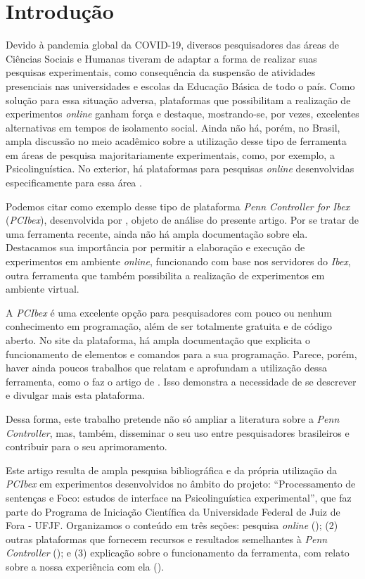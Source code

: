 \documentclass{textolivre}
\begin{document}
\section{Introdução}\label{sec-intro}
Devido à pandemia global da COVID-19, diversos pesquisadores das áreas de Ciências Sociais e Humanas tiveram de adaptar a forma de realizar suas pesquisas experimentais, como consequência da suspensão de atividades presenciais nas universidades e escolas da Educação Básica de todo o país. Como solução para essa situação adversa, plataformas que possibilitam a realização de experimentos \textit{online} ganham força e destaque, mostrando-se, por vezes, excelentes alternativas em tempos de isolamento social. Ainda não há, porém, no Brasil, ampla discussão no meio acadêmico sobre a utilização desse tipo de ferramenta em áreas de pesquisa majoritariamente experimentais, como, por exemplo, a Psicolinguística. No exterior, há plataformas para pesquisas \textit{online} desenvolvidas especificamente para essa área \cite{peirce2007, pizzo2015, zehr2018}.

Podemos citar como exemplo desse tipo de plataforma \emph{Penn Controller for Ibex} (\emph{PCIbex}), desenvolvida por \textcite{zehr2018}, objeto de análise do presente artigo. Por se tratar de uma ferramenta recente, ainda não há ampla documentação sobre ela. Destacamos sua importância por permitir a elaboração e execução de experimentos em ambiente \textit{online}, funcionando com base nos servidores do \emph{Ibex}, outra ferramenta que também possibilita a realização de experimentos em ambiente virtual.

A \emph{PCIbex} é uma excelente opção para pesquisadores com pouco ou nenhum conhecimento em programação, além de ser totalmente gratuita e de código aberto. No site da plataforma, há ampla documentação que explicita o funcionamento de elementos e comandos para a sua programação. Parece, porém, haver ainda poucos trabalhos que relatam e aprofundam a utilização dessa ferramenta, como o faz o artigo de \textcite{sedarous2020}. Isso demonstra a necessidade de se descrever e divulgar mais esta plataforma.

Dessa forma, este trabalho pretende não só ampliar a literatura sobre a \emph{Penn Controller}, mas, também, disseminar o seu uso entre pesquisadores brasileiros e contribuir para o seu aprimoramento.

Este artigo resulta de ampla pesquisa bibliográfica e da própria utilização da \emph{PCIbex} em experimentos desenvolvidos no âmbito do projeto: “Processamento de sentenças e Foco: estudos de interface na Psicolinguística experimental”, que faz parte do Programa de Iniciação Científica da Universidade Federal de Juiz de Fora - UFJF. Organizamos o conteúdo em três seções: pesquisa \textit{online} (); (2) outras plataformas que fornecem recursos e resultados semelhantes à \emph{Penn Controller} (); e (3) explicação sobre o funcionamento da ferramenta, com relato sobre a nossa experiência com ela ().
\end{document}
